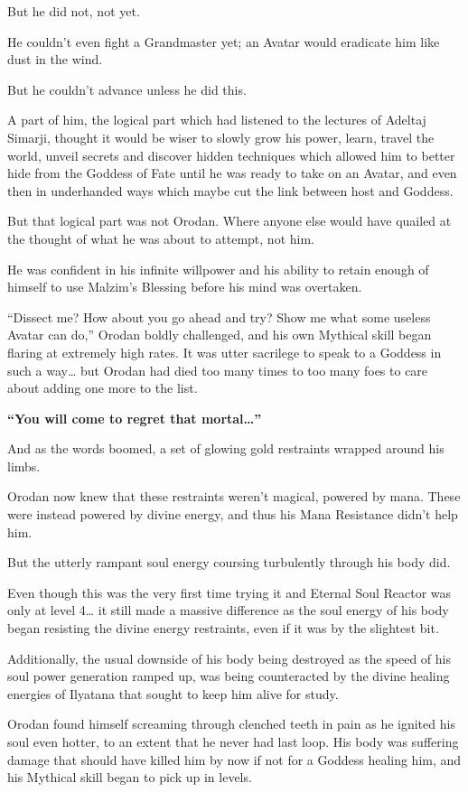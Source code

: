 \documentclass[a4paper,10pt]{book}
\begin{document}
But he did not, not yet.\par
He couldn’t even fight a Grandmaster yet; an Avatar would eradicate him like dust in the wind.\par
But he couldn’t advance unless he did this.\par
A part of him, the logical part which had listened to the lectures of Adeltaj Simarji, thought it would be wiser to slowly grow his power, learn, travel the world, unveil secrets and discover hidden techniques which allowed him to better hide from the Goddess of Fate until he was ready to take on an Avatar, and even then in underhanded ways which maybe cut the link between host and Goddess.\par
But that logical part was not Orodan. Where anyone else would have quailed at the thought of what he was about to attempt, not him.\par
He was confident in his infinite willpower and his ability to retain enough of himself to use Malzim’s Blessing before his mind was overtaken.\par
“Dissect me? How about you go ahead and try? Show me what some useless Avatar can do,” Orodan boldly challenged, and his own Mythical skill began flaring at extremely high rates. It was utter sacrilege to speak to a Goddess in such a way… but Orodan had died too many times to too many foes to care about adding one more to the list.\par
\textbf{“You will come to regret that mortal…”}\par
And as the words boomed, a set of glowing gold restraints wrapped around his limbs.\par
Orodan now knew that these restraints weren’t magical, powered by mana. These were instead powered by divine energy, and thus his Mana Resistance didn’t help him.\par
But the utterly rampant soul energy coursing turbulently through his body did.\par
Even though this was the very first time trying it and Eternal Soul Reactor was only at level 4… it still made a massive difference as the soul energy of his body began resisting the divine energy restraints, even if it was by the slightest bit.\par
Additionally, the usual downside of his body being destroyed as the speed of his soul power generation ramped up, was being counteracted by the divine healing energies of Ilyatana that sought to keep him alive for study.\par
Orodan found himself screaming through clenched teeth in pain as he ignited his soul even hotter, to an extent that he never had last loop. His body was suffering damage that should have killed him by now if not for a Goddess healing him, and his Mythical skill began to pick up in levels.\par
\end{document}
